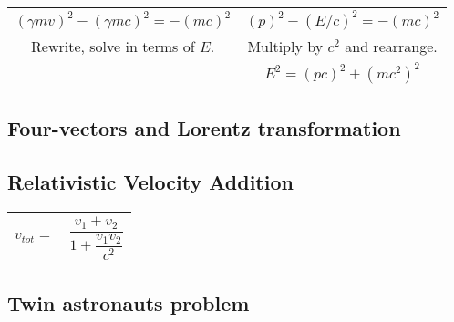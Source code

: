 \begin{tabular}{|c|c|}
\hline

 $(\gamma m v)^2 - (\gamma m c)^2 = -(mc)^2$& $(p)^2 - (E/c)^2 = -(mc)^2$ \\
 Rewrite, solve in terms of $E$. & Multiply by $c^2$ and rearrange. \\ 
 & $E^2 = (pc)^2 + (mc^2)^2$

\\ \hline
\end{tabular}
\flushleft


\subsection{Four-vectors and Lorentz transformation} 


\subsection{Relativistic Velocity Addition} 
\center
\begin{tabular}{|c|c|}
\hline

$v_{tot} = $ & $ \dfrac{v_1 + v_2}{1 + \dfrac{v_1 v_2}{c^2}} $

 \\ \hline
\end{tabular}
\flushleft


\subsection{Twin astronauts problem} 



